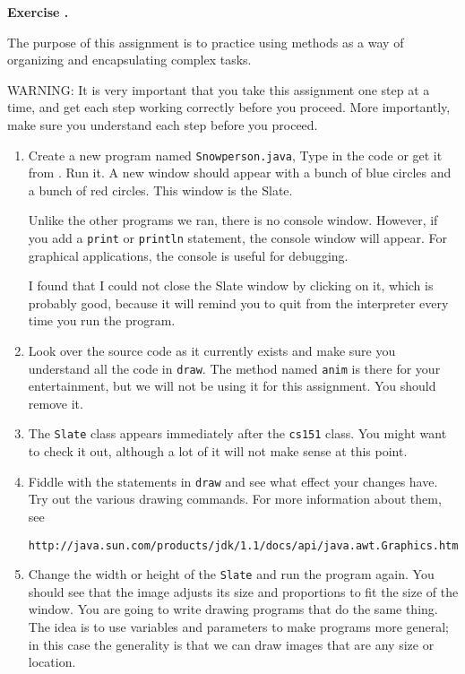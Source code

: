 \documentclass{book}
\newcounter{exercisenum}
\renewcommand{\theexercisenum}{{\thechapter}.\arabic{exercisenum}}
\newenvironment{exercisesize}{\begin{small}}{\end{small}}
\newcommand{\exerciseheader}[2]{                                          
     
  \begin{exercisesize}                                                    
     
     
  \def\theenumi{\alph{enumi}}                                             
  \def\labelenumi{\theenumi.}                                             
  \def\theenumii{\roman{enumii}}                                          
  \def\labelenumii{\theenumii.}                                           
  {\bf Exercise {#1}{#2}}\hspace{0.1in}                 
}
\newcommand{\startexercise}[1]{%
  \refstepcounter{exercisenum}                                            
  \exerciseheader{\theexercisenum}{#1}                                    
}
\newcommand{\stopexercise}{%
  {\hfill}                                                               
  \end{exercisesize}      
}
\newcommand{\normaldif}{}
\newenvironment{exercise}{\startexercise{\normaldif{}}}{\stopexercise}
\begin{document}
\begin{exercise}

The purpose of this assignment is to practice using methods
as a way of organizing and encapsulating complex tasks.

WARNING:  It is very important that you take this assignment
one step at a time, and get each step working correctly before
you proceed.  More importantly, make sure you understand each
step before you proceed.

\begin{enumerate}

\item
Create a new program named {\tt Snowperson.java},
Type in the code or get it from \url{}.
Run it.
A new window should appear with a bunch of blue circles and
a bunch of red circles.  This window is the Slate.

Unlike the other programs we ran, there is no console window.
However, if you add a {\tt print}
or {\tt println} statement, the console window will appear.
For graphical applications, the console is
useful for debugging.

I found that I could not close the Slate window by clicking on it,
which is probably good, because it will remind you to quit
from the interpreter every time you run the program.

\item Look over the source code as it currently exists and make
sure you understand all the code in {\tt draw}.  The method
named {\tt anim} is there for your entertainment, but we will
not be using it for this assignment.  You should remove it.

\item The {\tt Slate} class
appears immediately after the {\tt cs151} class.  You
might want to check it out, although a lot of it will not make
sense at this point.

\item Fiddle with the statements in {\tt draw}
and see what effect your changes have.  Try out the various
drawing commands.  For more information about them, see

\begin{verbatim}
http://java.sun.com/products/jdk/1.1/docs/api/java.awt.Graphics.html
\end{verbatim}

\item Change the width or height of the {\tt Slate} and run the
program again.  You should see that the image adjusts its size
and proportions to fit the size of the window.  You are going to
write drawing programs that do the same thing.  The idea is to
use variables and parameters to make programs more general; in
this case the generality is that we can draw images that are any
size or location.


\end{enumerate}
\end{exercise}
\end{document}

